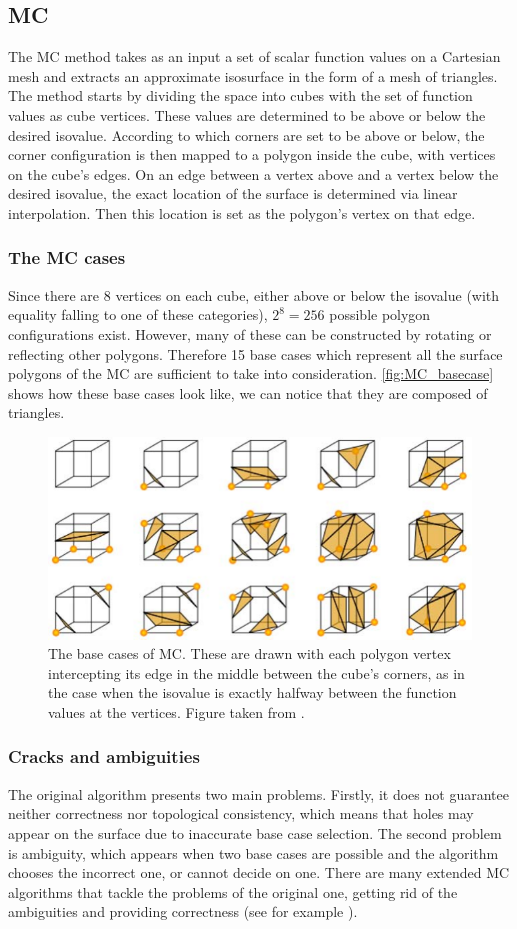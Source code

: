 \subsection{\Acl{MC}} 
The \acf{MC} method \cite{Marching2006} takes as an input a set of scalar function values on a Cartesian mesh and extracts an approximate isosurface in the form of a mesh of triangles. The method starts by dividing the space into cubes with the set of function values as cube vertices. These values are determined to be above or below the desired isovalue. According to which corners are set to be above or below, the corner configuration is then mapped to a polygon inside the cube, with vertices on the cube's edges. On an edge between a vertex above and a vertex below the desired isovalue, the exact location of the surface is determined via linear interpolation. Then this location is set as the polygon's vertex on that edge.

\subsubsection{The \acl{MC} cases}
Since there are 8 vertices on each cube, either above or below the isovalue (with equality falling to one of these categories), $2^8=256$ possible polygon configurations exist. However, many of these can be constructed by rotating or reflecting other polygons. Therefore 15 base cases which represent all the surface polygons of the \acl{MC} are sufficient to take into consideration. \autoref{fig:MC_basecase} shows how these base cases look like, we can notice that they are composed of triangles. 

\begin{figure}[b]
\centering
   \includegraphics[width=.5\textwidth]{Pictures/cubes.pdf}
   \caption{The base cases of \ac{MC}. These are drawn with each polygon vertex intercepting its edge in the middle between the cube's corners, as in the case when the isovalue is exactly halfway between the function values at the vertices. Figure taken from \cite{Marching2006}.}
   \label{fig:MC_basecase}
\end{figure}

\subsubsection{Cracks and ambiguities}
The original algorithm presents two main problems. Firstly, it does not guarantee neither correctness nor topological consistency, which means that holes may appear on the surface due to inaccurate base case selection. The second problem is ambiguity, which appears when two base cases are possible and the algorithm chooses the incorrect one, or cannot decide on one. There are many extended \ac{MC} algorithms that tackle the problems of the original one, getting rid of the ambiguities and providing correctness (see for example \cite{ExtendedMC}).